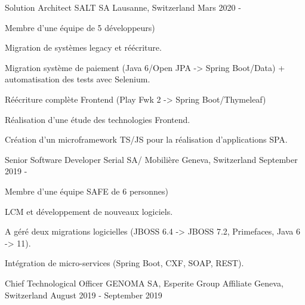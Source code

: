 

\begin{cventries}
\cventry
{Solution Architect} %
{SALT SA} %
{Lausanne, Switzerland} %
{Mars 2020 - } %
{
    \begin{cvitems} %
        \item{Membre d'une équipe de 5 développeurs)}
        \item{Migration de systèmes legacy et réécriture.}
        \item{Migration système de paiement (Java 6/Open JPA -> Spring Boot/Data) + automatisation des tests avec Selenium.}
        \item{Réécriture complète Frontend (Play Fwk 2 -> Spring Boot/Thymeleaf)}
        \item{Réalisation d'une étude des technologies Frontend.}
        \item{Création d'un microframework TS/JS pour la réalisation d'applications SPA.}
    \end{cvitems}
}
\cventry
{Senior Software Developer} %
{Serial SA/ Mobilière} %
{Geneva, Switzerland} %
{September 2019 - } %
{
    \begin{cvitems} %
        \item{Membre d'une équipe SAFE de 6 personnes)}
        \item{LCM et développement de nouveaux logiciels.}
        \item{A géré deux migrations logicielles (JBOSS 6.4 -> JBOSS 7.2, Primefaces, Java 6 -> 11).}
        \item{Intégration de micro-services (Spring Boot, CXF, SOAP, REST).}
    \end{cvitems}
}
\cventry
{Chief Technological Officer} %
{GENOMA SA, Esperite Group Affiliate} %
{Geneva, Switzerland} %
{August 2019 - September 2019 } %
{
    \begin{cvitems} %

\end{cvitems}}
\end{cventries}
